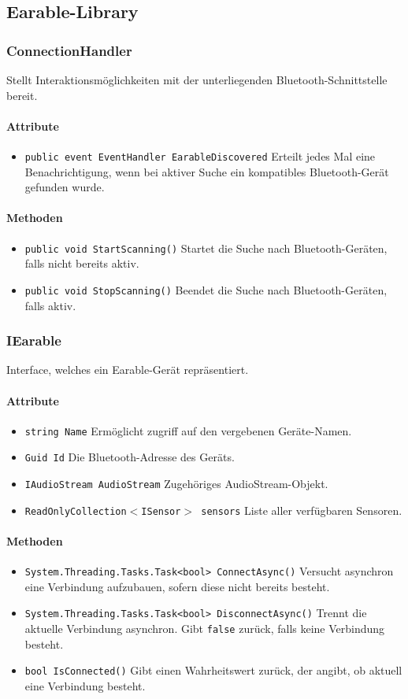 \documentclass[../entwurf.tex]{subfiles}
\begin{document}
\newcommand{\code}[1]{\texttt{#1}}
\renewcommand{\i}[1]{\item \code{#1}}

\subsection{Earable-Library}

\subsubsection{ConnectionHandler}
Stellt Interaktionsmöglichkeiten mit der unterliegenden Bluetooth-Schnittstelle bereit.
\paragraph{Attribute}
\begin{itemize}
	\i{public event EventHandler EarableDiscovered} Erteilt jedes Mal eine Benachrichtigung, wenn bei aktiver Suche ein kompatibles Bluetooth-Gerät gefunden wurde.
\end{itemize}
\paragraph{Methoden}
\begin{itemize}
	\i{public void StartScanning()} Startet die Suche nach Bluetooth-Geräten, falls nicht bereits aktiv.
	\i{public void StopScanning()} Beendet die Suche nach Bluetooth-Geräten, falls aktiv.
\end{itemize}


\subsubsection{IEarable}
Interface, welches ein Earable-Gerät repräsentiert.
\paragraph{Attribute}
\begin{itemize}
	\i{string Name} Ermöglicht zugriff auf den vergebenen Geräte-Namen.
	\i{Guid Id} Die Bluetooth-Adresse des Geräts.\footnotemark[1]
	\i{IAudioStream AudioStream} Zugehöriges AudioStream-Objekt.\footnotemark[1]
	\i{ReadOnlyCollection$<$ISensor$>$ sensors} Liste aller verfügbaren Sensoren.\footnotemark[1]
\end{itemize}
\paragraph{Methoden}
\begin{itemize}
	\i{System.Threading.Tasks.Task<bool> ConnectAsync()} Versucht asynchron eine Verbindung aufzubauen, sofern diese nicht bereits besteht.
	\i{System.Threading.Tasks.Task<bool> DisconnectAsync()} Trennt die aktuelle Verbindung asynchron. Gibt \code{false} zurück, falls keine Verbindung besteht.
	\i{bool IsConnected()} Gibt einen Wahrheitswert zurück, der angibt, ob aktuell eine Verbindung besteht.
\end{itemize}
\end{document}

